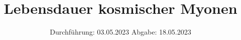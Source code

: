 

\subject{VERSUCH 01}
\title{Lebensdauer kosmischer Myonen}
\date{
  Durchführung: 03.05.2023
  \hspace{3em}
  Abgabe: 18.05.2023
}



\maketitle
\thispagestyle{empty}
\newpage









\newpage
\printbibliography{}

\newpage


% 

